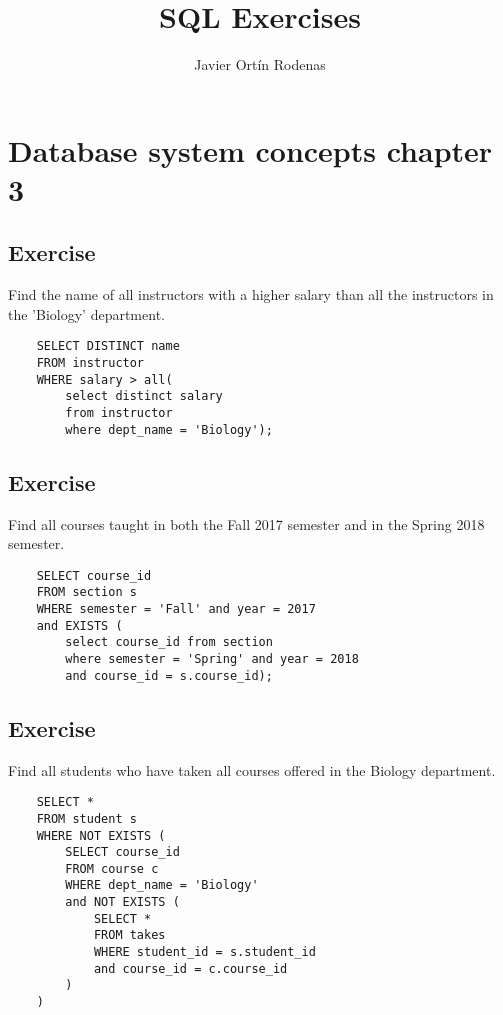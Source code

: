 \documentclass{article}
\title{SQL Exercises}
\author{Javier Ortín Rodenas}
\begin{document}
\maketitle
\noindent
\newpage
\section{Database system concepts chapter 3}
\vspace{2ex}
\subsection{Exercise}
Find the name of all instructors with a higher salary than all the instructors
in the 'Biology' department.
\vspace{2mm}
\begin{lstlisting}
    SELECT DISTINCT name 
    FROM instructor
    WHERE salary > all(
        select distinct salary
        from instructor
        where dept_name = 'Biology');
\end{lstlisting}

\vspace{4mm}
\subsection{Exercise}
\noindent Find all courses taught in both the
Fall 2017 semester and in the Spring 2018 semester.

\begin{lstlisting}
    SELECT course_id
    FROM section s
    WHERE semester = 'Fall' and year = 2017
    and EXISTS (
        select course_id from section
        where semester = 'Spring' and year = 2018
        and course_id = s.course_id);
\end{lstlisting}

\vspace{4mm}
\subsection{Exercise}
\noindent Find all students who have taken all courses offered in the Biology
department.

\begin{lstlisting}
    SELECT * 
    FROM student s
    WHERE NOT EXISTS (
        SELECT course_id
        FROM course c
        WHERE dept_name = 'Biology'
        and NOT EXISTS (
            SELECT *
            FROM takes
            WHERE student_id = s.student_id
            and course_id = c.course_id
        )
    )
\end{lstlisting}
\end{document}
